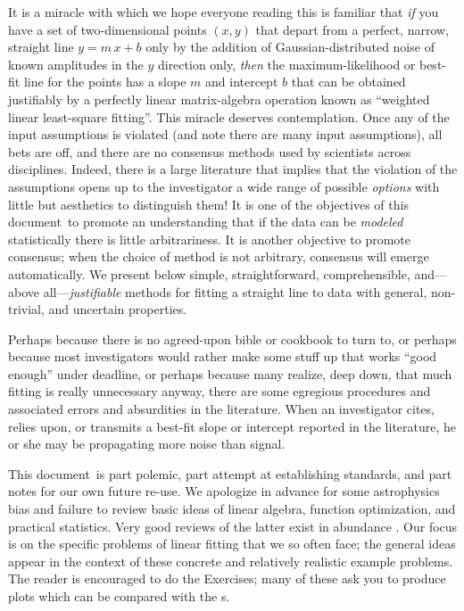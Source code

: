 \documentclass[12pt,twoside]{article}
\newcommand{\documentname}{document}
\newcommand{\problemname}{Exercise}
\newcounter{problem}
\begin{document}
It is a miracle with which we hope everyone reading this is familiar
that \emph{if} you have a set of two-dimensional points $(x,y)$ that
depart from a perfect, narrow, straight line $y=m\,x+b$ only by the
addition of Gaussian-distributed noise of known amplitudes in the $y$
direction only, \emph{then} the maximum-likelihood or best-fit line
for the points has a slope $m$ and intercept $b$ that can be obtained
justifiably by a perfectly linear matrix-algebra operation known as
``weighted linear least-square fitting''.  This miracle deserves
contemplation.  Once any of the input assumptions is violated (and
note there are many input assumptions), all bets are off, and there
are no consensus methods used by scientists across disciplines.
Indeed, there is a large literature that implies that the violation of
the assumptions opens up to the investigator a wide range of possible
\emph{options} with little but aesthetics to distinguish them!  It is
one of the objectives of this \documentname\ to promote an
understanding that if the data can be \emph{modeled} statistically
there is little arbitrariness.  It is another objective to promote
consensus; when the choice of method is not arbitrary, consensus will
emerge automatically.  We present below simple, straightforward,
comprehensible, and---above all---\emph{justifiable} methods for
fitting a straight line to data with general, non-trivial, and
uncertain properties.

Perhaps because there is no agreed-upon bible or cookbook to turn to,
or perhaps because most investigators would rather make some stuff up
that works ``good enough'' under deadline, or perhaps because many
realize, deep down, that much fitting is really unnecessary anyway,
there are some egregious procedures and associated errors and
absurdities in the literature.  When an investigator cites, relies upon,
or transmits a best-fit slope or intercept reported in the literature,
he or she may be propagating more noise than signal.

This \documentname\ is part polemic, part attempt at establishing standards,
and part notes for our own future re-use.  We apologize in advance for
some astrophysics bias and failure to review basic ideas of linear
algebra, function optimization, and practical statistics.  Very good
reviews of the latter exist in abundance \citep{mackay,press,sivia}.
Our focus is on the specific problems of linear fitting that we so
often face; the general ideas appear in the context of these concrete
and relatively realistic example problems.  The reader is encouraged
to do the \problemname s; many of these ask you to produce plots which
can be compared with the \figurename s.
\end{document}
